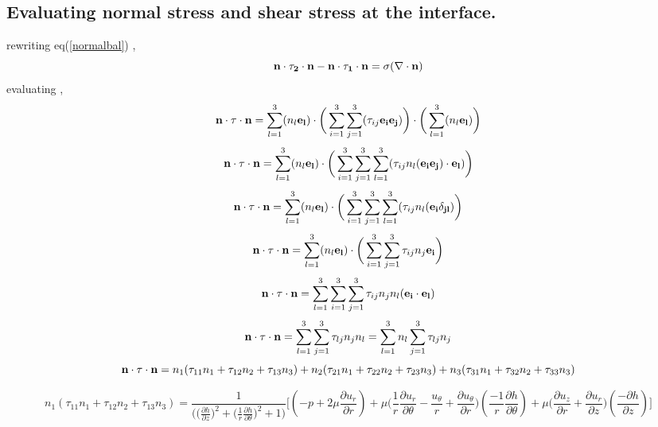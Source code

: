 \documentclass{article}
\begin{document}
\subsection{Evaluating normal stress and shear stress at the interface.}
rewriting eq(\ref{normalbal}) ,
\begin{equation*}
{\bf n \cdot \tau_{2} \cdot n} - {\bf n\cdot \tau_{1} \cdot n} = \sigma {\bf (\nabla \cdot n)}
\end{equation*}
evaluating ,
\begin{equation}
{\bf {n \cdot \tau \cdot n}} = \sum_{l=1}^{3} (n_{l}{\bf e_{l}}) \cdot \bigg(\sum_{i=1}^{3}\sum_{j=1}^{3} (\tau_{ij}{\bf e_{i}e_{j}})\bigg)\cdot \bigg(\sum_{l=1}^{3} (n_{l}{\bf e_{l}})\bigg)
\end{equation}
\begin{equation*}
{\bf {n \cdot \tau \cdot n}} = \sum_{l=1}^{3} (n_{l}{\bf e_{l}}) \cdot \bigg(\sum_{i=1}^{3}\sum_{j=1}^{3}\sum_{l=1}^{3} (\tau_{ij}  n_{l}({\bf e_{i}e_{j}})\cdot {\bf e_{l}})\bigg)
\end{equation*}
\begin{equation*}
{\bf {n \cdot \tau \cdot n}} = \sum_{l=1}^{3} (n_{l}{\bf e_{l}}) \cdot \bigg(\sum_{i=1}^{3}\sum_{j=1}^{3}\sum_{l=1}^{3} (\tau_{ij}  n_{l}({\bf e_{i}\delta_{jl}})\bigg)
\end{equation*}
\begin{equation*}
{\bf {n \cdot \tau \cdot n}} = \sum_{l=1}^{3} (n_{l}{\bf e_{l}}) \cdot \bigg(\sum_{i=1}^{3}\sum_{j=1}^{3} \tau_{ij}  n_{j}{\bf e_{i}}\bigg)
\end{equation*}
\begin{equation*}
{\bf {n \cdot \tau \cdot n}} = \sum_{l=1}^{3}\sum_{i=1}^{3}\sum_{j=1}^{3} \tau_{ij}n_{j}n_{l}({\bf e_{i} \cdot e_{l}})
\end{equation*}
\begin{equation*}
{\bf {n \cdot \tau \cdot n}} = \sum_{l=1}^{3}\sum_{j=1}^{3} \tau_{lj}n_{j}n_{l} = \sum_{l=1}^{3}n_{l}\sum_{j=1}^{3} \tau_{lj}n_{j}
\end{equation*}
\begin{equation}
{\bf {n \cdot \tau \cdot n}} = n_{1}(\tau_{11}n_{1} + \tau_{12}n_{2} + \tau_{13}n_{3}) +  n_{2}(\tau_{21}n_{1} + \tau_{22}n_{2} + \tau_{23}n_{3}) +  n_{3}(\tau_{31}n_{1} + \tau_{32}n_{2} + \tau_{33}n_{3}) 
\end{equation}

\begin{equation}

n_{1}(\tau_{11}n_{1} + \tau_{12}n_{2} + \tau_{13}n_{3}) = \frac{1}{\bigg(\bigg(\frac{\partial h}{\partial z}\bigg)^2 + \bigg(\frac{1}{r}\frac{\partial h}{\partial \theta}\bigg)^2 + 1\bigg)} 
\bigg[(-p + 2\mu \frac{\partial u_{r}}{\partial r}) + 
 \mu \bigg(\frac{1}{r}\frac{\partial u_{r}}{\partial \theta} -\frac{u_{\theta }}{r}+\frac{\partial u_{\theta }}{\partial r}\bigg)(\frac{-1}{r}\frac{\partial h}{\partial \theta}) + \mu \bigg(\frac{\partial u_{z}}{\partial r} + \frac{\partial u_{r}}{\partial z}\bigg)(\frac{-\partial h}{\partial z})\bigg]
\end{equation}
\end{document}
